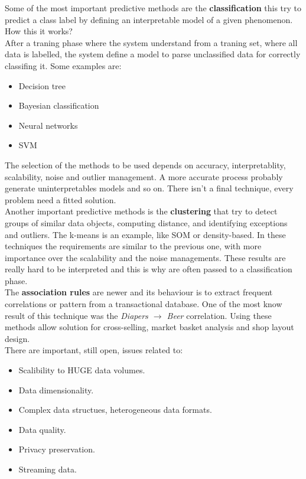 \documentclass[12pt]{article}
\begin{document}
Some of the most important predictive methods are the \textbf{classification} this try to predict a class label by defining an interpretable model of a given phenomenon.\\
How this it works?\\
After a traning phase where the system understand from a traning set, where all data is labelled, the system define a model to parse unclassified data for correctly classifing it. Some examples are:
\begin{itemize}
  \item Decision tree
  \item Bayesian classification
  \item Neural networks
  \item SVM
\end{itemize}
The selection of the methods to be used depends on accuracy, interpretablity, scalability, noise and outlier management. A more accurate process probably generate uninterpretables models and so on. There isn't a final technique, every problem need a fitted solution.\\
Another important predictive methods is the \textbf{clustering} that try to detect groups of similar data objects, computing distance, and identifying exceptions and outliers. The k-means is an example, like SOM or density-based. In these techniques the requirements are similar to the previous one, with more importance over the scalability and the noise managements. These results are really hard to be interpreted and this is why are often passed to a classification phase.\\
The \textbf{association rules} are newer and its behaviour is to extract frequent correlations or pattern from a transactional database. One of the most know result of this technique was the \textit{Diapers $\rightarrow$ Beer} correlation. Using these methods allow solution for cross-selling, market basket analysis and shop layout design.\\
There are important, still open, issues related to:
\begin{itemize}
  \item Scalibility to HUGE data volumes.
  \item Data dimensionality.
  \item Complex data structues, heterogeneous data formats.
  \item Data quality.
  \item Privacy preservation.
  \item Streaming data.
\end{itemize}
\end{document}
